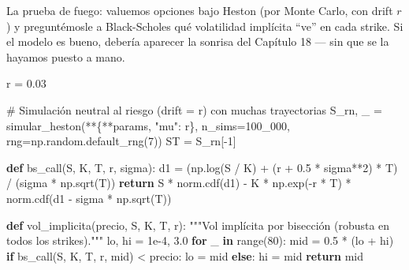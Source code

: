 \documentclass[
  spanish,
  letterpaper,
  DIV=11,
  numbers=noendperiod]{scrreprt}
\newenvironment{Shaded}{\begin{snugshade}}{\end{snugshade}}
\newcommand{\BuiltInTok}[1]{\textcolor[rgb]{0.00,0.23,0.31}{#1}}
\newcommand{\CommentTok}[1]{\textcolor[rgb]{0.37,0.37,0.37}{#1}}
\newcommand{\ControlFlowTok}[1]{\textcolor[rgb]{0.00,0.23,0.31}{\textbf{#1}}}
\newcommand{\DecValTok}[1]{\textcolor[rgb]{0.68,0.00,0.00}{#1}}
\newcommand{\FloatTok}[1]{\textcolor[rgb]{0.68,0.00,0.00}{#1}}
\newcommand{\KeywordTok}[1]{\textcolor[rgb]{0.00,0.23,0.31}{\textbf{#1}}}
\newcommand{\NormalTok}[1]{\textcolor[rgb]{0.00,0.23,0.31}{#1}}
\newcommand{\OperatorTok}[1]{\textcolor[rgb]{0.37,0.37,0.37}{#1}}
\newcommand{\StringTok}[1]{\textcolor[rgb]{0.13,0.47,0.30}{#1}}
\begin{document}
La prueba de fuego: valuemos opciones bajo Heston (por Monte Carlo, con
drift \(r\)) y preguntémosle a Black-Scholes qué volatilidad implícita
``ve'' en cada strike. Si el modelo es bueno, debería aparecer la
sonrisa del Capítulo 18 --- sin que se la hayamos puesto a mano.

\begin{Shaded}
\begin{Highlighting}[]
\NormalTok{r }\OperatorTok{=} \FloatTok{0.03}

\CommentTok{\# Simulación neutral al riesgo (drift = r) con muchas trayectorias}
\NormalTok{S\_rn, \_ }\OperatorTok{=}\NormalTok{ simular\_heston(}\OperatorTok{**}\NormalTok{\{}\OperatorTok{**}\NormalTok{params, }\StringTok{"mu"}\NormalTok{: r\}, n\_sims}\OperatorTok{=}\DecValTok{100\_000}\NormalTok{,}
\NormalTok{                         rng}\OperatorTok{=}\NormalTok{np.random.default\_rng(}\DecValTok{7}\NormalTok{))}
\NormalTok{ST }\OperatorTok{=}\NormalTok{ S\_rn[}\OperatorTok{{-}}\DecValTok{1}\NormalTok{]}

\KeywordTok{def}\NormalTok{ bs\_call(S, K, T, r, sigma):}
\NormalTok{    d1 }\OperatorTok{=}\NormalTok{ (np.log(S }\OperatorTok{/}\NormalTok{ K) }\OperatorTok{+}\NormalTok{ (r }\OperatorTok{+} \FloatTok{0.5} \OperatorTok{*}\NormalTok{ sigma}\OperatorTok{**}\DecValTok{2}\NormalTok{) }\OperatorTok{*}\NormalTok{ T) }\OperatorTok{/}\NormalTok{ (sigma }\OperatorTok{*}\NormalTok{ np.sqrt(T))}
    \ControlFlowTok{return}\NormalTok{ S }\OperatorTok{*}\NormalTok{ norm.cdf(d1) }\OperatorTok{{-}}\NormalTok{ K }\OperatorTok{*}\NormalTok{ np.exp(}\OperatorTok{{-}}\NormalTok{r }\OperatorTok{*}\NormalTok{ T) }\OperatorTok{*}\NormalTok{ norm.cdf(d1 }\OperatorTok{{-}}\NormalTok{ sigma }\OperatorTok{*}\NormalTok{ np.sqrt(T))}

\KeywordTok{def}\NormalTok{ vol\_implicita(precio, S, K, T, r):}
    \CommentTok{"""Vol implícita por bisección (robusta en todos los strikes)."""}
\NormalTok{    lo, hi }\OperatorTok{=} \FloatTok{1e{-}4}\NormalTok{, }\FloatTok{3.0}
    \ControlFlowTok{for}\NormalTok{ \_ }\KeywordTok{in} \BuiltInTok{range}\NormalTok{(}\DecValTok{80}\NormalTok{):}
\NormalTok{        mid }\OperatorTok{=} \FloatTok{0.5} \OperatorTok{*}\NormalTok{ (lo }\OperatorTok{+}\NormalTok{ hi)}
        \ControlFlowTok{if}\NormalTok{ bs\_call(S, K, T, r, mid) }\OperatorTok{\textless{}}\NormalTok{ precio:}
\NormalTok{            lo }\OperatorTok{=}\NormalTok{ mid}
        \ControlFlowTok{else}\NormalTok{:}
\NormalTok{            hi }\OperatorTok{=}\NormalTok{ mid}
    \ControlFlowTok{return}\NormalTok{ mid}


\end{Highlighting}
\end{Shaded}
\end{document}
